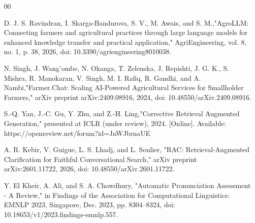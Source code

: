 \documentclass[conference]{IEEEtran}
\begin{document}
\begin{thebibliography}{00}

 D. J. S. Ravindran, I. Skarga-Bandurova, S. V., M. Awais, and S. M.,"AgroLLM: Connecting farmers and agricultural practices through large language models for enhanced knowledge transfer and practical application," 
AgriEngineering, vol. 8, no. 1, p. 38, 2026, doi: 10.3390/agriengineering8010038.

 N. Singh, J. Wang’ombe, N. Okanga, T. Zelenska, J. Repishti, J. G. K., S. Mishra, R. Manokaran, V. Singh, M. I. Rafiq, R. Gandhi, and A. Nambi,"Farmer.Chat: Scaling AI-Powered Agricultural Services for Smallholder Farmers," arXiv preprint arXiv:2409.08916, 2024, doi: 10.48550/arXiv.2409.08916.

 S.-Q. Yan, J.-C. Gu, Y. Zhu, and Z.-H. Ling,"Corrective Retrieval Augmented Generation," 
presented at ICLR (under review), 2024. [Online]. Available: https://openreview.net/forum?id=JnWJbrnaUE

A. R.  Kebir, V. Guigue, L. S. Lhadj, and L. Soulier, "RAC: Retrieval-Augmented Clarification for Faithful Conversational Search," 
arXiv preprint arXiv:2601.11722, 2026, doi: 10.48550/arXiv.2601.11722.

 Y. El Kheir, A. Ali, and S. A. Chowdhury, 
"Automatic Pronunciation Assessment - A Review," 
in Findings of the Association for Computational Linguistics: EMNLP 2023, Singapore, Dec. 2023, pp. 8304–8324, doi: 10.18653/v1/2023.findings-emnlp.557.

\end{thebibliography}
\end{document}

